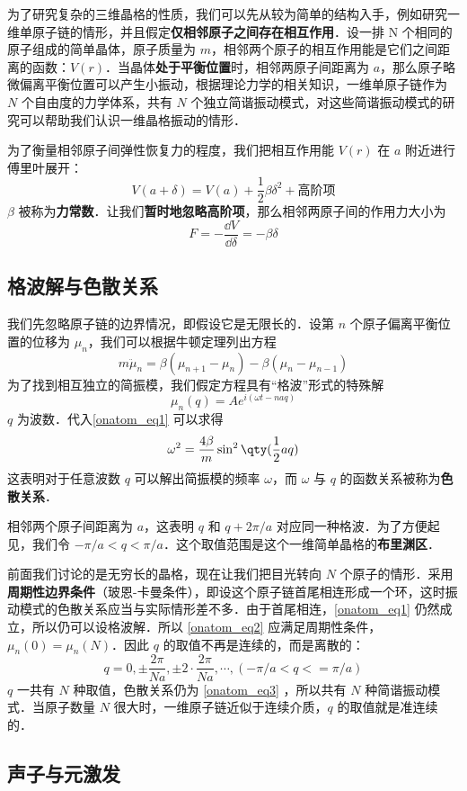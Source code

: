 

为了研究复杂的三维晶格的性质，我们可以先从较为简单的结构入手，例如研究一维单原子链的情形，并且假定\textbf{仅相邻原子之间存在相互作用}．设一排 N 个相同的原子组成的简单晶体，原子质量为 $m$，相邻两个原子的相互作用能是它们之间距离的函数：$V(r)$．当晶体\textbf{处于平衡位置}时，相邻两原子间距离为 $a$，那么原子略微偏离平衡位置可以产生小振动，根据理论力学的相关知识，一维单原子链作为 $N$ 个自由度的力学体系，共有 $N$ 个独立简谐振动模式，对这些简谐振动模式的研究可以帮助我们认识一维晶格振动的情形．

为了衡量相邻原子间弹性恢复力的程度，我们把相互作用能 $V(r)$ 在 $a$ 附近进行傅里叶展开：
\begin{equation}
V(a+\delta)=V(a)+\frac{1}{2}\beta \delta^2+\text{高阶项}
\end{equation}
$\beta$ 被称为\textbf{力常数}．让我们\textbf{暂时地忽略高阶项}，那么相邻两原子间的作用力大小为
\begin{equation}
F=-\frac{\dd V}{\dd \delta}=-\beta\delta
\end{equation}

\subsection{格波解与色散关系}
我们先忽略原子链的边界情况，即假设它是无限长的．设第 $n$ 个原子偏离平衡位置的位移为 $\mu_n$，我们可以根据牛顿定理列出方程
\begin{equation}\label{onatom_eq1}
m \ddot \mu_n = \beta(\mu_{n+1}-\mu_n)-\beta(\mu_n - \mu_{n-1})
\end{equation}
为了找到相互独立的简振模，我们假定方程具有“格波”形式的特殊解
\begin{equation}\label{onatom_eq2}
\mu_{n}(q)=Ae^{i(\omega t-naq)}
\end{equation}
$q$ 为波数．代入\autoref{onatom_eq1} 可以求得
\begin{equation}\label{onatom_eq3}
\omega^2=\frac{4\beta}{m}\sin^2 \qty(\frac{1}{2}aq)
\end{equation}
这表明对于任意波数 $q$ 可以解出简振模的频率 $\omega$，而 $\omega$ 与 $q$ 的函数关系被称为\textbf{色散关系}．

相邻两个原子间距离为 $a$，这表明 $q$ 和 $q+2\pi/a$ 对应同一种格波．为了方便起见，我们令 $-\pi/a<q<\pi/a$．这个取值范围是这个一维简单晶格的\textbf{布里渊区}．

前面我们讨论的是无穷长的晶格，现在让我们把目光转向 $N$ 个原子的情形．采用\textbf{周期性边界条件}（玻恩-卡曼条件），即设这个原子链首尾相连形成一个环，这时振动模式的色散关系应当与实际情形差不多．由于首尾相连，\autoref{onatom_eq1} 仍然成立，所以仍可以设格波解．所以 \autoref{onatom_eq2} 应满足周期性条件，$\mu_n(0)=\mu_n(N)$．因此 $q$ 的取值不再是连续的，而是离散的：
\begin{equation}
q=0,\pm \frac{2\pi}{Na},\pm 2\cdot \frac{2\pi}{Na},\cdots, (-\pi/a<q<=\pi/a)
\end{equation}
$q$ 一共有 $N$ 种取值，色散关系仍为 \autoref{onatom_eq3} ，所以共有 $N$ 种简谐振动模式．当原子数量 $N$ 很大时，一维原子链近似于连续介质，$q$ 的取值就是准连续的．
\subsection{声子与元激发}